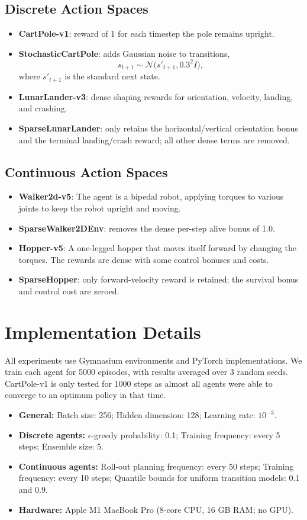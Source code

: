 \documentclass[11pt,a4paper]{report}
\begin{document}
\subsection{Discrete Action Spaces}
\begin{itemize}
  \item \textbf{CartPole-v1}: reward of 1 for each timestep the pole remains upright.
  \item \textbf{StochasticCartPole}: adds Gaussian noise to transitions,
    \[
      s_{t+1} \sim \mathcal{N}\bigl(s'_{t+1}, 0.3^2 I\bigr),
    \]
    where \(s'_{t+1}\) is the standard next state.
  \item \textbf{LunarLander-v3}: dense shaping rewards for orientation, velocity, landing, and crashing.
  \item \textbf{SparseLunarLander}: only retains the horizontal/vertical orientation bonus and the terminal landing/crash reward; all other dense terms are removed.
\end{itemize}

\subsection{Continuous Action Spaces}
\begin{itemize}
  \item \textbf{Walker2d-v5}: The agent is a bipedal robot, applying torques to various joints to keep the robot upright and moving.
  \item \textbf{SparseWalker2DEnv}: removes the dense per-step alive bonus of 1.0.
  \item \textbf{Hopper-v5}: A one-legged hopper that moves itself forward by changing the torques. The rewards are dense with some control bonuses and costs.
  \item \textbf{SparseHopper}: only forward-velocity reward is retained; the survival bonus and control cost are zeroed.
\end{itemize}

\section{Implementation Details}
All experiments use Gymnasium environments and PyTorch implementations. We train each agent for 5000 episodes, with results averaged over 3 random seeds. CartPole-v1 is only tested for 1000 steps as almost all agents were able to converge to an optimum policy in that time.

\begin{itemize}
  \item \textbf{General:} Batch size: 256; Hidden dimension: 128; Learning rate: \(10^{-3}\).
  \item \textbf{Discrete agents:} \(\epsilon\)-greedy probability: 0.1; Training frequency: every 5 steps; Ensemble size: 5.
  \item \textbf{Continuous agents:} Roll-out planning frequency: every 50 steps; Training frequency: every 10 steps; Quantile bounds for uniform transition models: 0.1 and 0.9. 
  \item \textbf{Hardware:} Apple M1 MacBook Pro (8-core CPU, 16 GB RAM; no GPU).
\end{itemize}
\end{document}
